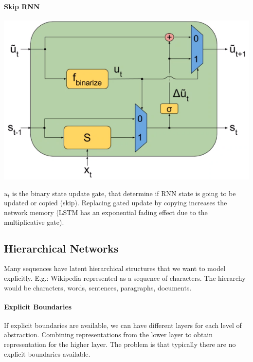 \documentclass[10pt]{report}
\begin{document}
\paragraph{Skip RNN}
\begin{center}
	\includegraphics[scale=0.5]{125.png}
\end{center}
$u_t$ is the binary state update gate, that determine if RNN state is going to be updated or copied (skip). Replacing gated update by copying increases the network memory (LSTM has an exponential fading effect due to the multiplicative gate).
\subsection{Hierarchical Networks}
Many sequences have latent hierarchical structures that we want to model explicitly. E.g.: Wikipedia represented as a sequence of characters. The hierarchy would be characters, words, sentences, paragraphs, documents.
\paragraph{Explicit Boundaries} If explicit boundaries are available, we can have different layers for each level of abstraction. Combining representations from the lower layer to obtain representation for the higher layer. The problem is that typically there are no explicit boundaries available.
\end{document}
